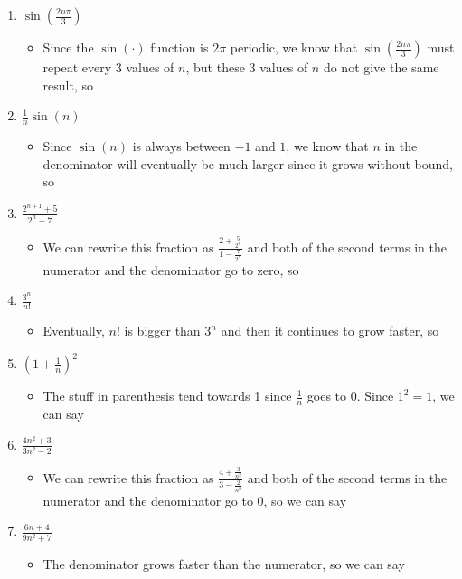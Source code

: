 \documentclass[10pt,a4paper]{article}
\theoremstyle{definition}
\begin{document}
\begin{enumerate}[label = (\alph*)]
\begin{itemize}
	\end{itemize}
\item $\displaystyle \sin\left(\frac{2n\pi}{3}\right)$
	\begin{itemize}
	\item Since the $\sin(\cdot)$ function is $2\pi$ periodic, we know that $\displaystyle \sin\left(\frac{2n \pi}{3}\right)$ must repeat every 3 values of $n$, but these 3 values of $n$ do not give the same result, so 
	\end{itemize}
\item $\displaystyle \frac{1}{n}\sin(n)$
	\begin{itemize}
	\item Since $\sin(n)$ is always between $-1$ and $1$, we know that $n$ in the denominator will eventually be much larger since it grows without bound, so 
	\end{itemize}
\item $\displaystyle \frac{2^{n+1} + 5}{2^n - 7}$
	\begin{itemize}
	\item We can rewrite this fraction as $\displaystyle \frac{2 + \frac{5}{2^n}}{1 - \frac{7}{2^n}}$ and both of the second terms in the numerator and the denominator go to zero, so 
	\end{itemize}
\item $\displaystyle \frac{3^n}{n!}$
	\begin{itemize}
	\item Eventually, $n!$ is bigger than $3^n$ and then it continues to grow faster, so 
	\end{itemize}
\item $\displaystyle \left(1 + \frac{1}{n}\right)^2$
	\begin{itemize}
	\item The stuff in parenthesis tend towards 1 since $\displaystyle \frac{1}{n}$ goes to 0. Since $1^2 = 1$, we can say 
	\end{itemize}
\item $\displaystyle \frac{4n^2 + 3}{3n^2 - 2}$
	\begin{itemize}
	\item We can rewrite this fraction as $\displaystyle \frac{4 + \frac{3}{n^2}}{3 - \frac{2}{n^2}}$ and both of the second terms in the numerator and the denominator go to 0, so we can say 
	\end{itemize}
\item $\displaystyle \frac{6n + 4}{9n^2 + 7}$
	\begin{itemize}
	\item The denominator grows faster than the numerator, so we can say 
	\end{itemize}
\end{enumerate}
\end{document}
